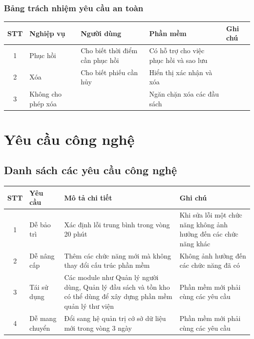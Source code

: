 \documentclass[12pt]{report}
\begin{document}
            \subsubsection{Bảng trách nhiệm yêu cầu an toàn}
                \begin{tabularx}{\textwidth}{|c|l|>{\RaggedRight}X|>{\RaggedRight}X|l|}
                    \hline
                    \textbf{STT} & \textbf{Nghiệp vụ} & 
                    \textbf{Người dùng} & \textbf{Phần mềm} & Ghi chú \\ \hline
                    1 & Phục hồi & Cho biết thời điểm cần phục hồi & Có hỗ trợ cho việc phục hồi và sao lưu & \\ \hline
                    2 & Xóa & Cho biết phiếu cần hủy & Hiển thị xác nhận và xóa & \\ \hline
                    3 & Không cho phép xóa & & Ngăn chặn xóa các đầu sách & \\ \hline
                \end{tabularx}
    \section{Yêu cầu công nghệ}
        \subsection{Danh sách các yêu cầu công nghệ}
            \begin{tabularx}{\textwidth}{|c|l|>{\RaggedRight}X|>{\RaggedRight}X|}
                \hline
                \textbf{STT} & \textbf{Yêu cầu} & 
                \textbf{Mô tả chi tiết} & Ghi chú \\ \hline
                1 & Dễ bảo trì & Xác định lỗi trung bình trong vòng 20 phút & Khi sửa lỗi một chức năng không ảnh hưởng đến các chức năng khác \\ \hline
                2 & Dễ nâng cấp & Thêm các chức năng mới mà không thay đổi cấu trúc phần mềm & Không ảnh hưởng đến các chức năng đã có \\ \hline
                3 & Tái sử dụng & Các module như Quản lý người dùng, Quản lý đầu sách và tồn kho có thể dùng để xây dựng phần mềm quản lý thư viện & Phần mềm mới phải cùng các yêu cầu \\ \hline
                4 & Dễ mang chuyển & Đổi sang hệ quản trị cớ sở dữ liệu mới trong vòng 3 ngày & Phần mềm mới phải cùng các yêu cầu \\ \hline
            \end{tabularx}
\end{document}
